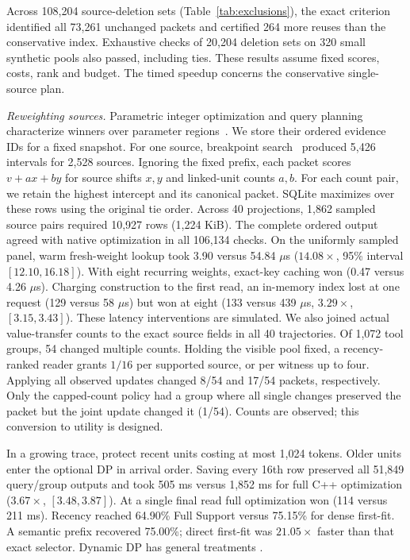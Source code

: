\documentclass[conference]{IEEEtran}
\begin{document}
Across 108,204 source-deletion sets (Table~\ref{tab:exclusions}), the exact criterion identified all 73,261 unchanged packets and certified 264 more reuses than the conservative index. Exhaustive checks of 20,204 deletion sets on 320 small synthetic pools also passed, including ties. These results assume fixed scores, costs, rank and budget. The timed speedup concerns the conservative single-source plan.

\noindent\textit{Reweighting sources.} Parametric integer optimization and query planning characterize winners over parameter regions~\cite{crema,ganguly}. We store their ordered evidence IDs for a fixed snapshot. For one source, breakpoint search~\cite{eisner} produced 5,426 intervals for 2,528 sources. Ignoring the fixed prefix, each packet scores $v+ax+by$ for source shifts $x,y$ and linked-unit counts $a,b$. For each count pair, we retain the highest intercept and its canonical packet. SQLite maximizes over these rows using the original tie order. Across 40 projections, 1,862 sampled source pairs required 10,927 rows (1,224 KiB). The complete ordered output agreed with native optimization in all 106,134 checks. On the uniformly sampled panel, warm fresh-weight lookup took 3.90 versus 54.84 $\mu$s ($14.08\times$, 95\% interval $[12.10,16.18]$). With eight recurring weights, exact-key caching won (0.47 versus 4.26 $\mu$s). Charging construction to the first read, an in-memory index lost at one request (129 versus 58 $\mu$s) but won at eight (133 versus 439 $\mu$s, $3.29\times$, $[3.15,3.43]$). These latency interventions are simulated. We also joined actual value-transfer counts to the exact source fields in all 40 trajectories. Of 1,072 tool groups, 54 changed multiple counts. Holding the visible pool fixed, a recency-ranked reader grants $1/16$ per supported source, or per witness up to four. Applying all observed updates changed 8/54 and 17/54 packets, respectively. Only the capped-count policy had a group where all single changes preserved the packet but the joint update changed it (1/54). Counts are observed; this conversion to utility is designed.

In a growing trace, protect recent units costing at most 1,024 tokens. Older units enter the optional DP in arrival order. Saving every 16th row preserved all 51,849 query/group outputs and took 505 ms versus 1,852 ms for full C++ optimization ($3.67\times$, $[3.48,3.87]$). At a single final read full optimization won (114 versus 211 ms). Recency reached 64.90\% Full Support versus 75.15\% for dense first-fit. A semantic prefix recovered 75.00\%; direct first-fit was $21.05\times$ faster than that exact selector. Dynamic DP has general treatments \cite{dynamicdp}.
\end{document}
